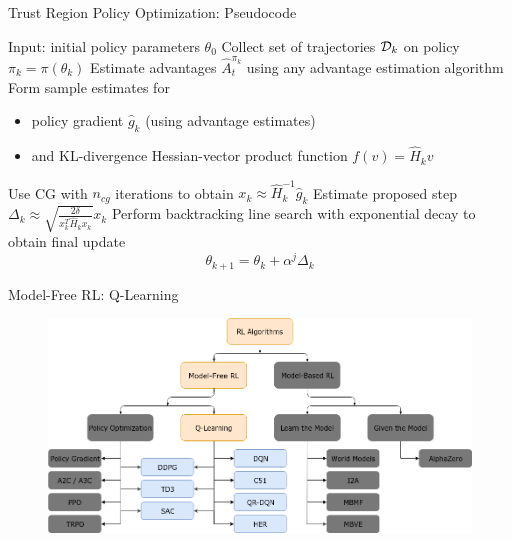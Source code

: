 \documentclass[9pt]{beamer}
\begin{document}
\begin{frame}{Trust Region Policy Optimization: Pseudocode}

\begin{algorithm}[H]
   \caption{Trust Region Policy Optimization}
   \label{alg1}
\begin{algorithmic}
     \STATE Input: initial policy parameters $\theta_0$
	 \STATE Collect set of trajectories ${\mathcal D}_k$ on policy $\pi_k = \pi(\theta_k)$
	 \STATE Estimate advantages $\hat{A}^{\pi_k}_t$ using any advantage estimation algorithm
	 \STATE Form sample estimates for
	 \begin{itemize}
	 \item policy gradient $\hat{g}_k$ (using advantage estimates)
	 \item and KL-divergence Hessian-vector product function $f(v) = \hat{H}_k v$
	 \end{itemize}
	 \STATE Use CG with $n_{cg}$ iterations to obtain $x_k \approx \hat{H}^{-1}_k \hat{g}_k$
	 \STATE Estimate proposed step $\Delta_k \approx \sqrt{\frac{2\delta}{x_k^T \hat{H}_k x_k}} x_k$
	 \STATE Perform backtracking line search with exponential decay to obtain final update
	 \begin{equation*}
	 \theta_{k+1} = \theta_k + \alpha^j \Delta_k
	 \end{equation*}

	\ENDFOR
\end{algorithmic}
\end{algorithm}

\end{frame}

\begin{frame}{Model-Free RL: Q-Learning}
\begin{figure}
\centering
\includegraphics[width=\linewidth]{rl_algorithms_qlearn_only}
\end{figure}
\end{frame}
\end{document}
